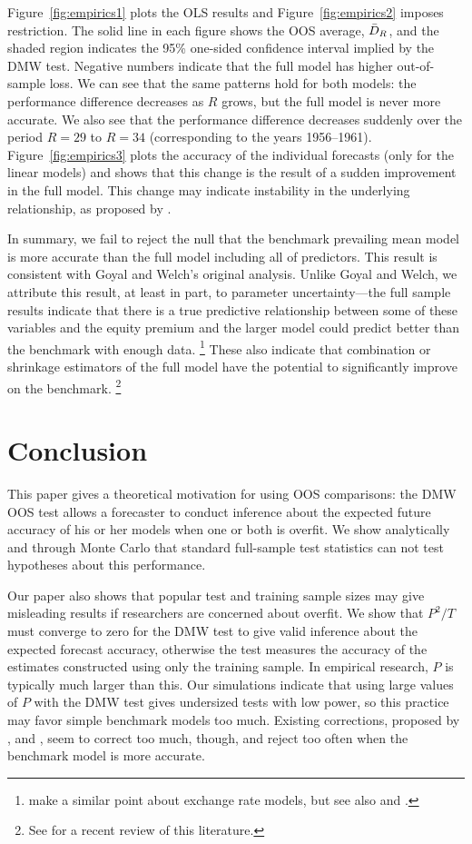 \documentclass[12pt]{article}
\begin{document}
Figure~\ref{fig:empirics1} plots the OLS results and
Figure~\ref{fig:empirics2} imposes  restriction. The
solid line in each figure shows the OOS average, $\bar{D}_{R}$, and the
shaded region indicates the 95\% one-sided confidence interval implied
by the DMW test.  Negative numbers indicate that the full model has
higher out-of-sample loss.  We can see that the same patterns hold for
both models: the performance difference decreases as $R$ grows, but
the full model is never more accurate.  We also see that the
performance difference decreases suddenly over the period $R=29$ to
$R=34$ (corresponding to the years 1956--1961).
Figure~\ref{fig:empirics3} plots the accuracy of the individual
forecasts (only for the linear models) and shows that this change is
the result of a sudden improvement in the full model.  This change may
indicate instability in the underlying relationship, as proposed by
\citet{GoW:08}.

In summary, we fail to reject the null that the benchmark prevailing
mean model is more accurate than the full model including all of
 predictors.  This result is consistent with Goyal and
Welch's original analysis.  Unlike Goyal and Welch, we attribute this
result, at least in part, to parameter uncertainty---the full sample
results indicate that there is a true predictive relationship between
some of these variables and the equity premium and the larger model
could predict better than the benchmark with enough data.%
\footnote{\citet{BWB:10} make a similar point about exchange rate
  models, but see also \citet{Chi:10} and \citet{Gia:10}.} %
These also indicate that combination or shrinkage estimators of the
full model have the potential to significantly improve on the benchmark.%
\footnote{See \citet{RaZ:12} for a recent review of this
  literature.} %

\section{Conclusion}
\label{sec:conclusion}

This paper gives a theoretical motivation for using OOS comparisons:
the DMW OOS test allows a forecaster to conduct inference about
the expected future accuracy of his or her models when one or both is
overfit.  We show analytically and through Monte Carlo that standard
full-sample test statistics can not test hypotheses about this
performance.

Our paper also shows that popular test and training sample sizes may
give misleading results if researchers are concerned about overfit.
We show that $P^2/T$ must converge to zero for the DMW test to give
valid inference about the expected forecast accuracy, otherwise the
test measures the accuracy of the estimates constructed using only the
training sample.  In empirical research, $P$ is typically much larger
than this.  Our simulations indicate that using large values of $P$
with the DMW test gives undersized tests with low power, so this
practice may favor simple benchmark models too much.  Existing
corrections, proposed by \citet{ClM:01,ClM:05}, \citet{Mcc:07} and
\citet{ClW:06,ClW:07}, seem to correct too much, though, and reject
too often when the benchmark model is more accurate.
\end{document}
